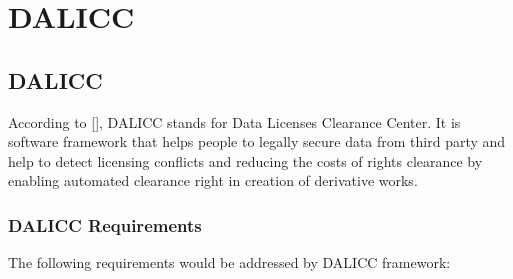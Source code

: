 \chapter{DALICC}
\section{DALICC}
According to [], DALICC stands for Data Licenses Clearance Center. It is software framework that helps people to legally secure data from third party and help to detect licensing conflicts and reducing the costs of rights clearance by enabling automated clearance right in creation of derivative works. 
\subsection{DALICC Requirements}
The following requirements would be addressed by DALICC framework:\\

